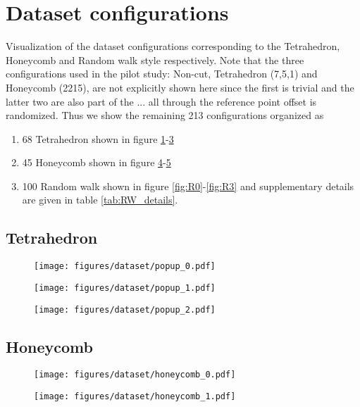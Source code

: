 \section{Dataset configurations}\label{sec:dataset_conf}

Visualization of the dataset configurations corresponding to the Tetrahedron, Honeycomb and Random walk style respectively. Note that the three configurations used in the pilot study: Non-cut, Tetrahedron (7,5,1) and Honeycomb (2215), are not explicitly shown here since the first is trivial and the latter two are also part of the ... all through the reference point offset is randomized. Thus we show the remaining 213 configurations organized as
\begin{enumerate}
    \item 68 Tetrahedron shown in figure \ref{fig:T0}-\ref{fig:T2}
    \item 45 Honeycomb shown in figure \ref{fig:H0}-\ref{fig:H1}
    \item 100 Random walk shown in figure \ref{fig:R0}-\ref{fig:R3} and supplementary details are given in table \ref{tab:RW_details}.
\end{enumerate}


\subsection{Tetrahedron}
\begin{figure}[H]
    \centering
    \texttt{[image: figures/dataset/popup\_0.pdf]}
    \caption{}
    \label{fig:T0}
\end{figure}
\begin{figure}[H]
    \centering
    \texttt{[image: figures/dataset/popup\_1.pdf]}
    \caption{}
    \label{fig:T1}
\end{figure}
\begin{figure}[H]
    \centering
    \texttt{[image: figures/dataset/popup\_2.pdf]}
    \caption{}
    \label{fig:T2}
\end{figure}


\subsection{Honeycomb}
\begin{figure}[H]
    \centering
    \texttt{[image: figures/dataset/honeycomb\_0.pdf]}
    \caption{}
    \label{fig:H0}
\end{figure}
\begin{figure}[H]
    \centering
    \texttt{[image: figures/dataset/honeycomb\_1.pdf]}
    \caption{}
    \label{fig:H1}
\end{figure}

